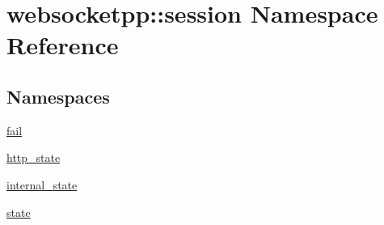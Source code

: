 \hypertarget{namespacewebsocketpp_1_1session}{}\section{websocketpp\+:\+:session Namespace Reference}
\label{namespacewebsocketpp_1_1session}
\subsection*{Namespaces}
\begin{DoxyCompactItemize}
\item 
 \hyperlink{namespacewebsocketpp_1_1session_1_1fail}{fail}
\item 
 \hyperlink{namespacewebsocketpp_1_1session_1_1http__state}{http\+\_\+state}
\item 
 \hyperlink{namespacewebsocketpp_1_1session_1_1internal__state}{internal\+\_\+state}
\item 
 \hyperlink{namespacewebsocketpp_1_1session_1_1state}{state}
\end{DoxyCompactItemize}
